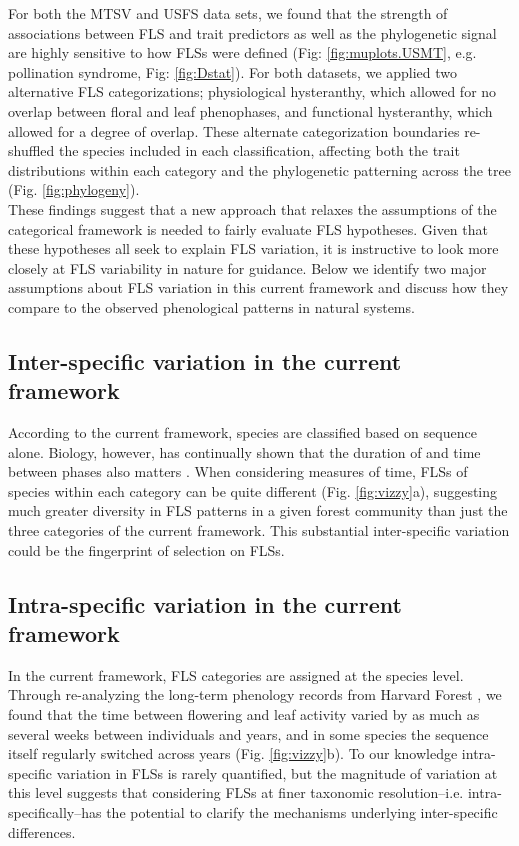 \documentclass{article}
\begin{document}
\noindent For both the MTSV and USFS data sets, we found that the strength of associations between FLS and trait predictors as well as the phylogenetic signal are highly sensitive to how FLSs were defined (Fig: \ref{fig:muplots.USMT}, e.g. pollination syndrome, Fig: \ref{fig:Dstat}). For both datasets, we applied two alternative FLS categorizations; physiological hysteranthy, which allowed for no overlap between floral and leaf phenophases, and functional hysteranthy, which allowed for a degree of overlap. These alternate categorization boundaries re-shuffled the species included in each classification, affecting both the trait distributions within each category and the phylogenetic patterning across the tree (Fig. \ref{fig:phylogeny}).\\ 
 
\noindent These findings suggest that a new approach that relaxes the assumptions of the categorical framework is needed to fairly evaluate FLS hypotheses. Given that these hypotheses all seek to explain FLS variation, it is instructive to look more closely at FLS variability in nature for guidance. Below we identify two major assumptions about FLS variation in this current framework and discuss how they compare to the observed phenological patterns in natural systems.\\

\subsection*{Inter-specific variation in the current framework}
\noindent According to the current framework, species are classified based on sequence alone. Biology, however, has continually shown that the duration of and time between phases also matters \citep{Inouye2019}. When considering measures of time, FLSs of species within each category can be quite different (Fig. \ref{fig:vizzy}a), suggesting much greater diversity in FLS patterns in a given forest community than just the three categories of the current framework. This substantial inter-specific variation could be the fingerprint of selection on FLSs.\\ %

\subsection*{Intra-specific variation in the current framework}
\noindent In the current framework, FLS categories are assigned at the species level. Through re-analyzing the long-term phenology records from  Harvard Forest \citep{OKeefe2015}, we found that the time between flowering and leaf activity varied by as much as several weeks between individuals and years, and in some species the sequence itself regularly switched across years (Fig. \ref{fig:vizzy}b). To our knowledge intra-specific variation in FLSs is rarely quantified, but the magnitude of variation at this level suggests that considering FLSs at finer taxonomic resolution--i.e. intra-specifically--has the potential to clarify the mechanisms underlying inter-specific differences.\\
\end{document}
